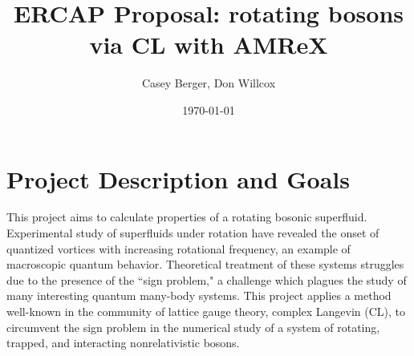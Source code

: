 \documentclass[onecolumn, 12pt]{article}
\title{ERCAP Proposal: rotating bosons via CL with AMReX}
\author{Casey Berger, Don Willcox}
\date{\today}
\begin{document}
\section{Project Description and Goals}
	
	
	

	

	
This project aims to calculate properties of a rotating bosonic superfluid. Experimental study of superfluids under rotation have revealed the onset of quantized vortices with increasing rotational frequency, an example of macroscopic quantum behavior. Theoretical treatment of these systems struggles due to the presence of the ``sign problem," a challenge which plagues the study of many interesting quantum many-body systems. This project applies a method well-known in the community of lattice gauge theory, complex Langevin (CL), to circumvent the sign problem in the numerical study of a system of rotating, trapped, and interacting nonrelativistic bosons. 
\end{document}
